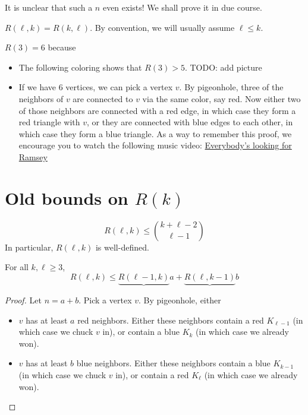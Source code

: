 \documentclass{article}
\begin{document}
It is unclear that such a $n$ even exists! We shall prove it in due course.

$R(\ell, k) = R(k, \ell)$. By convention, we will usually assume $\ell \le k$.

\begin{eg}
  $R(3) = 6$ because
  \begin{itemize}
    \item The following coloring shows that $R(3) > 5$. TODO: add picture
    \item If we have $6$ vertices, we can pick a vertex $v$. By pigeonhole, three of the neighbors of $v$ are connected to $v$ via the same color, say red. Now either two of those neighbors are connected with a red edge, in which case they form a red triangle with $v$, or they are connected with blue edges to each other, in which case they form a blue triangle. As a way to remember this proof, we encourage you to watch the following music video: \href{https://youtu.be/vE7MW2lk55E}{Everybody's looking for Ramsey}
  \end{itemize}
\end{eg}

\section{Old bounds on \texorpdfstring{$R(k)$}{R(k)}}

\begin{thm}
  $$R(\ell, k) \le \binom{k + \ell - 2}{\ell - 1}$$
  In particular, $R(\ell, k)$ is well-defined.
\end{thm}

\begin{lemma}
  For all $k, \ell \ge 3$,
  $$R(\ell, k) \le \underbrace{R(\ell - 1, k)}a + \underbrace{R(\ell, k - 1)}b$$
\end{lemma}
\begin{proof}
  Let $n = a + b$. Pick a vertex $v$. By pigeonhole, either
  \begin{itemize}
    \item $v$ has at least $a$ red neighbors. Either these neighbors contain a red $K_{\ell - 1}$ (in which case we chuck $v$ in), or contain a blue $K_k$ (in which case we already won).
    \item $v$ has at least $b$ blue neighbors. Either these neighbors contain a blue $K_{k - 1}$ (in which case we chuck $v$ in), or contain a red $K_\ell$ (in which case we already won).
  \end{itemize}
\end{proof}
\end{document}
